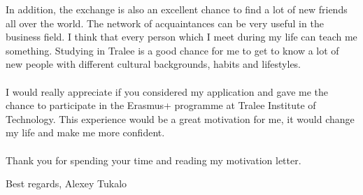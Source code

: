 \documentclass[english]{article}
\begin{document}
In addition, the exchange is also an excellent chance to find a lot of new friends all over the world. The network of acquaintances can be very useful in the business field. I think that every person which I meet during my life can teach me something. Studying in Tralee is a good chance for me to get to know a lot of new people with different cultural backgrounds, habits and lifestyles. \\\\
I would really appreciate if you considered my application and gave me the chance to participate in the Erasmus+ programme at Tralee Institute of Technology. This experience would be a great motivation for me, it would change my life and make me more confident. \\\\
Thank you for spending your time and reading my motivation letter.
\begin{flushright}
Best regards, Alexey Tukalo
\end{flushright}
\end{document}

